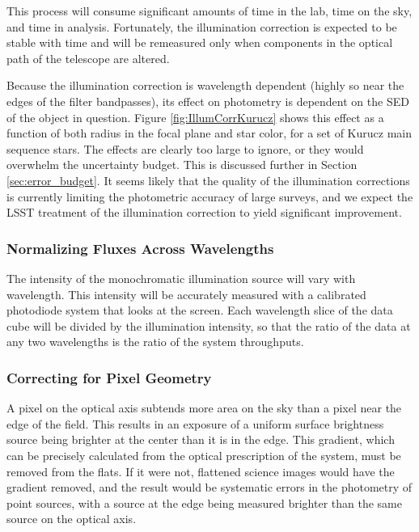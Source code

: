 \documentclass[12pt,preprint]{aastex}
\begin{document}
This process will consume significant amounts of time in the lab, time on the sky, and time in analysis.  
Fortunately, the illumination correction is expected to be stable with time and will be remeasured only when components in the
optical path of the telescope are altered.

Because the illumination correction is wavelength dependent (highly so near the edges of the filter bandpasses), its effect on photometry is dependent on the SED of the object in question.  Figure \ref{fig:IllumCorrKurucz} shows this effect as a function of both 
radius in the focal plane and star color, for a set of Kurucz main sequence stars.   The effects are clearly too large to ignore, or they would overwhelm the uncertainty budget.   This is discussed further in Section \ref{sec:error_budget}.  It seems likely that the quality 
of the illumination corrections is currently limiting the photometric accuracy of large surveys, and we expect the LSST treatment of the illumination correction to yield significant improvement.

\subsubsection{Normalizing Fluxes Across Wavelengths}

The intensity of the monochromatic illumination source will vary with wavelength.  This intensity will be accurately 
measured with a calibrated
photodiode system that looks at the screen.  Each wavelength slice of the data cube will be divided by the illumination intensity,
so that the ratio of the data at any two wavelengths is the ratio of the system throughputs.

\subsubsection{Correcting for Pixel Geometry}

A pixel on the optical axis subtends more area on the sky than a pixel near the edge of the field.  This results in an
exposure of a uniform surface brightness source being brighter at the center than it is in the edge.  This gradient, which
can be precisely calculated from the optical prescription of the system, must be removed from the flats.  If it were not,
flattened science images would have the gradient removed, and the result would be systematic errors in the photometry of 
point sources, with a source at the edge being measured brighter than the same source on the optical axis.
\end{document}
